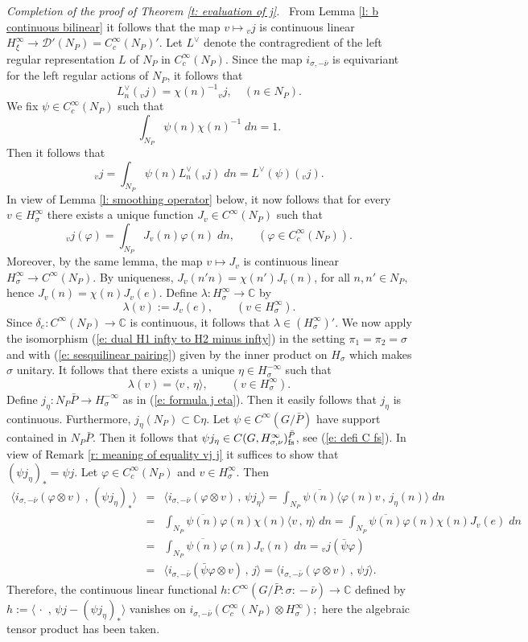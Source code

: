 \documentclass[12pt,a4paper]{article}
\def\qquad{\quad\quad}
\def\msy#1{{\mathbb #1}}
\def\C{{\msy C}}
\def\gd{\delta}
\def\gf{\varphi}
\def\gl{\lambda}
\def\gs{\sigma}
\def\to{\rightarrow}
\def\inp#1#2{\langle#1\,,\,#2\rangle}
\def\cD{{\mathcal D}}
\numberwithin{Thm}{section}
\numberwithin{equation}{section}
\def\dotvar{\, \cdot\,}
\numberwithin{equation}{section}
\def\fds{{\rm fs}}
\def\col{\!:\!}
\def\jv{{}_vj}
\def\cchi{\chi}
\def\veec{\vee}%
\begin{document}
{\em Completion of the proof of Theorem \ref{t: evaluation of j}.\ }
From Lemma \ref{l: b continuous bilinear} it follows that the map $v \mapsto {}_v j$ 
is continuous linear $H_\xi^\infty \to \cD'(N_P) =C_c^\infty(N_P)'.$ 
Let $L^\veec$ denote the contragredient of the left regular representation $L$ of $N_P$ 
in $C^\infty_c(N_P).$ 
Since the map $i_{\gs, -\bar \nu}$ 
is equivariant for the left regular actions of $N_P$, it follows that  
$$ 
L_{n}^\veec (\jv) =  \cchi(n)^{-1}  \jv,\quad (n \in N_P).
$$%
We fix  $\psi \in C_c^\infty(N_P)$ such that
$$ 
\int_{N_P} \psi(n) \cchi(n)^{-1} \; dn = 1.
$$%
Then it follows that 
$$ 
\jv = \int_{N_P} \psi(n) L_n^\veec (\jv ) \; dn = L^\veec(\psi)(\jv).
$$%
In view of Lemma \ref{l: smoothing operator} below, it now follows that for every $v \in H_\gs^\infty$ 
there exists a unique function $J_v \in C^\infty(N_P)$ such that 
$$ 
\jv(\gf) = \int_{N_P} J_v(n) \gf(n)\; dn, \qquad (\gf \in C_c^\infty(N_P)).
$$%
Moreover, by the same lemma, the map $v \mapsto J_v$ is continuous linear
$H_\gs^\infty \to C^\infty(N_P).$ 
By uniqueness, $J_v(n'n) = \cchi(n') J_v(n)$, for all $n, n' 
\in N_P,$ 
hence 
$J_v(n) = \cchi(n) J_v(e).$ 
Define
$ \gl : H_\gs^\infty \to \C$ by 
$$
\gl(v):= J_v(e),\qquad (v \in H_\gs^\infty).
$$%
Since $\gd_e: C^\infty(N_P) \to \C$ is continuous, it follows that $\gl \in (H^\infty_\gs)'.$ 
We now apply the isomorphism (\ref{e: dual H1 infty to H2 minus infty}) in the setting  $\pi_1 = \pi_2 = \gs$ and with (\ref{e: sesquilinear pairing}) given by the inner product on $H_\gs$ which makes $\gs$ unitary. It follows that there 
exists a unique $\eta \in H_\gs^{-\infty}$
such that 
$$ 
\gl(v) = \inp{v}{\eta},\qquad (v \in H_\gs^\infty).
$$ 
Define 
$j_\eta: N_P \bar P \to H_\gs^{-\infty}$ as in (\ref{e: formula j eta}). Then it easily follows that $j_\eta$ is continuous. Furthermore, $j_\eta(N_P) \subset \C \eta.$ Let $\psi \in C^\infty(G/\bar P)$ 
have support contained in $N_P \bar P.$ Then it follows that 
$\psi j_\eta \in C(G, H_{\gs, \nu}^\infty)_{\fds}^{\bar P}$, see (\ref{e: defi C fs}). In view of Remark \ref{r: meaning of equality vj j} it suffices to show that $(\psi j_\eta)_* = \psi j.$ 
Let $\gf \in C_c^\infty(N_P)$ and $v \in H^\infty_\gs.$ Then 
\begin{eqnarray*}
\inp{i_{\gs, -\bar \nu}(\gf \otimes v)}{(\psi j_\eta)_*}&=& 
\inp{i_{\gs, -\bar \nu}(\gf \otimes v)}{\psi j_\eta} 
 =  \int_{N_P} \overline{\psi(n)}\inp{\gf(n)v }{j_\eta(n)}\; dn\\
& = &  \int_{N_P} \overline{\psi(n)}\gf(n)  \cchi(n) \inp{v}{\eta} \; dn =
\int_{N_P} \overline{\psi(n)}\gf(n)  \cchi(n) J_v(e) \; dn\\
&=& \int_{N_P} \overline{\psi(n)} \gf(n) J_v(n) \; dn 
= \jv(\bar \psi \gf) \\
& =&  \inp{i_{\gs, -\bar\nu}(\bar\psi \gf \otimes v)}{j}
= \inp{i_{\gs, -\bar \nu}( \gf \otimes v)}{\psi j} .
\end{eqnarray*}
Therefore,  the continuous linear functional 
$h : C^\infty(G/\bar P \col \gs \col -\bar \nu) \to \C$ defined by 
$h:= \inp{\dotvar}{\psi j - (\psi j_\eta)_*}$ 
vanishes on $i_{\gs,-\bar \nu}(C^\infty_c(N_P) \otimes H_\gs^\infty);$ 
here the algebraic tensor product has been taken.
\end{document}
